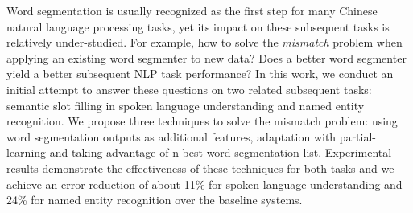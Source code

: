 Word segmentation is usually recognized as the first step for many Chinese natural language processing tasks, yet its impact on these subsequent tasks is relatively under-studied. For example, how to solve the {\it mismatch} problem when applying an existing word segmenter to new data? Does a better word segmenter yield a better subsequent NLP task performance? In this work, we conduct an initial attempt to answer these questions on two related subsequent tasks: semantic slot filling in spoken language understanding and named entity recognition. We propose three techniques to solve the mismatch problem: using word segmentation outputs as additional features, adaptation with partial-learning and taking advantage of n-best word segmentation list. Experimental results demonstrate the effectiveness of these techniques for both tasks and we achieve an error reduction of about 11\% for spoken language understanding and 24\% for named entity recognition over the baseline systems.
